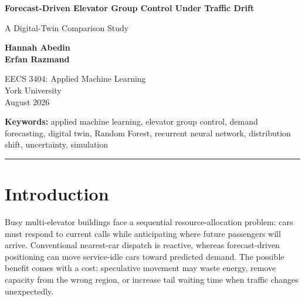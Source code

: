 \documentclass[12pt]{article}
\newcommand{\projecttitle}{Forecast-Driven Elevator Group Control Under Traffic Drift}
\newcommand{\projectsubtitle}{A Digital-Twin Comparison Study}
\newcommand{\makeprojecttitle}{%
  \begin{center}
    {\LARGE\bfseries \projecttitle\par}
    \vspace{0.25em}
    {\large \projectsubtitle\par}
    \vspace{0.65em}
    \begingroup
    \setstretch{1.0}
    \textbf{Hannah Abedin}\\[0.35em]
    \textbf{Erfan Razmand}
    \par
    \endgroup
    \vspace{0.55em}
    EECS 3404: Applied Machine Learning\\
    York University\\
    August 2026
  \end{center}
  \vspace{0.35em}
}
\begin{document}
\makeprojecttitle

\begin{abstract}
Elevator group control is an operational machine-learning problem in which
small forecasting improvements do not necessarily translate into better
passenger service. This project develops a deterministic digital twin of a
15-floor office building with four elevators and evaluates whether
short-horizon, per-floor passenger-demand forecasts can improve idle-car
positioning under normal traffic and distribution shift. Leakage-safe temporal
features and independent building-day splits are used to compare mean,
historical, persistence, Ridge, Random Forest, and from-scratch Elman recurrent
forecasters. The controllers are evaluated against nearest-car and static
zoning using passenger waiting time, tail wait, long-wait rate, floor fairness,
and elevator movement. On the untouched in-distribution holdout, Random Forest
reduces per-floor mean absolute error from 0.897 to 0.868 relative to the
historical baseline, with a paired 95\% bootstrap interval of 0.011 to 0.046
passengers for the reduction. However, its forecast-driven controller changes
mean wait from 16.023 to 16.038 seconds, worsens P95 wait by 1.168 seconds, and
increases movement by 1.75\%. These results demonstrate that better offline
prediction does not guarantee operational value. The primary engineering
limitation is the greedy positioning layer, which lacks destination-aware
routing, capacity planning, and an explicit tail-service objective.
\end{abstract}

\noindent\textbf{Keywords:} applied machine learning, elevator group control,
demand forecasting, digital twin, Random Forest, recurrent neural network,
distribution shift, uncertainty, simulation

\vspace{0.75em}
\hrule
\vspace{0.75em}

\section{Introduction}

Busy multi-elevator buildings face a sequential resource-allocation problem:
cars must respond to current calls while anticipating where future passengers
will arrive. Conventional nearest-car dispatch is reactive, whereas
forecast-driven positioning can move service-idle cars toward predicted demand.
The possible benefit comes with a cost: speculative movement may waste energy,
remove capacity from the wrong region, or increase tail waiting time when
traffic changes unexpectedly.
\end{document}
